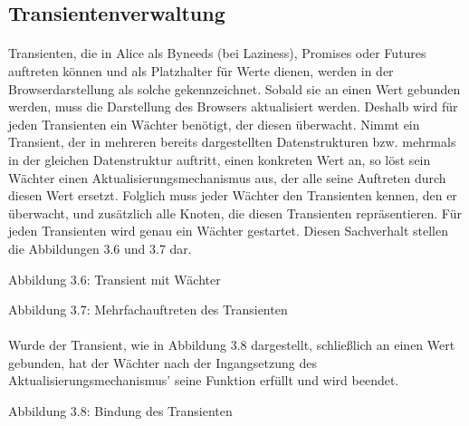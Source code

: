 \documentclass[12pt,a4paper]{article}
\begin{document}
\subsection{Transientenverwaltung}

\paragraph{}

Transienten, die in Alice als Byneeds (bei Laziness), 
Promises oder Futures auftreten k\"onnen und als Platzhalter f\"ur Werte
dienen, werden in der Browserdarstellung
als solche gekennzeichnet. Sobald sie an einen Wert gebunden werden, muss
die Darstellung des Browsers aktualisiert werden. Deshalb wird
f\"ur jeden Transienten ein W\"achter ben\"otigt, der diesen \"uberwacht.
Nimmt ein Transient, der in mehreren bereits dargestellten 
Datenstrukturen bzw. mehrmals in der gleichen Datenstruktur auftritt, 
einen konkreten Wert an, so l\"ost sein W\"achter einen 
Aktualisierungsmechanismus aus, der alle seine Auftreten durch diesen 
Wert ersetzt. Folglich muss jeder W\"achter den Transienten kennen, 
den er \"uberwacht, und zus\"atzlich alle Knoten, die diesen 
Transienten repr\"asentieren. F\"ur jeden 
Transienten wird genau ein W\"achter gestartet. Diesen Sachverhalt stellen 
die Abbildungen 3.6 und 3.7 dar.

\begin{center}
\linebreak 
Abbildung 3.6: Transient mit W\"{a}chter
\end{center}

\begin{center}
\linebreak 
Abbildung 3.7: Mehrfachauftreten des Transienten
\end{center}

\paragraph{}

Wurde der Transient, wie in Abbildung 3.8 dargestellt, schlie\ss lich
an einen Wert gebunden, hat der W\"achter nach der Ingangsetzung des
Aktualisierungsmechanismus' seine Funktion erf\"ullt und
wird beendet.

\begin{center}
\linebreak 
Abbildung 3.8: Bindung des Transienten
\end{center}
\end{document}
